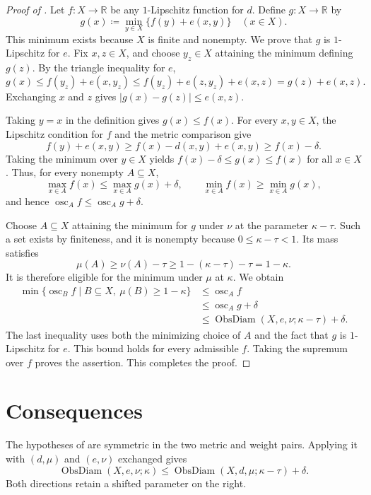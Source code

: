 \documentclass[a4paper,11pt]{article}
\theoremstyle{definition}
\DeclareMathOperator{\ObsDiam}{ObsDiam}
\DeclareMathOperator{\osc}{osc}
\begin{document}
\begin{proof}[Proof of ]
Let $f\colon X\to\mathbb R$ be any $1$-Lipschitz function for $d$. Define $g\colon X\to\mathbb R$ by
\[ g(x)\coloneqq\min_{y\in X}\{f(y)+e(x,y)\}\quad(x\in X). \]
This minimum exists because $X$ is finite and nonempty. We prove that $g$ is $1$-Lipschitz for $e$. Fix $x,z\in X$, and choose $y_z\in X$ attaining the minimum defining $g(z)$. By the triangle inequality for $e$,
\[ g(x)\leq f(y_z)+e(x,y_z)\leq f(y_z)+e(z,y_z)+e(x,z)=g(z)+e(x,z). \]
Exchanging $x$ and $z$ gives $|g(x)-g(z)|\leq e(x,z)$.

Taking $y=x$ in the definition gives $g(x)\leq f(x)$. For every $x,y\in X$, the Lipschitz condition for $f$ and the metric comparison give
\[ f(y)+e(x,y)\geq f(x)-d(x,y)+e(x,y)\geq f(x)-\delta. \]
Taking the minimum over $y\in X$ yields $f(x)-\delta\leq g(x)\leq f(x)$ for all $x\in X$. Thus, for every nonempty $A\subseteq X$,
\[ \max_{x\in A}f(x)\leq\max_{x\in A}g(x)+\delta,\qquad \min_{x\in A}f(x)\geq\min_{x\in A}g(x), \]
and hence $\osc_A f\leq\osc_A g+\delta$.

Choose $A\subseteq X$ attaining the minimum for $g$ under $\nu$ at the parameter $\kappa-\tau$. Such a set exists by finiteness, and it is nonempty because $0\leq\kappa-\tau<1$. Its mass satisfies
\[ \mu(A)\geq\nu(A)-\tau\geq1-(\kappa-\tau)-\tau=1-\kappa. \]
It is therefore eligible for the minimum under $\mu$ at $\kappa$. We obtain
\begin{align*}
\min\{\osc_B f\mid B\subseteq X,\ \mu(B)\geq1-\kappa\}
&\leq\osc_A f\\
&\leq\osc_A g+\delta\\
&\leq\ObsDiam(X,e,\nu;\kappa-\tau)+\delta.
\end{align*}
The last inequality uses both the minimizing choice of $A$ and the fact that $g$ is $1$-Lipschitz for $e$. This bound holds for every admissible $f$. Taking the supremum over $f$ proves the assertion. This completes the proof.
\end{proof}

\section{Consequences}\label{sec:consequences}

The hypotheses of  are symmetric in the two metric and weight pairs. Applying it with $(d,\mu)$ and $(e,\nu)$ exchanged gives
\[ \ObsDiam(X,e,\nu;\kappa)\leq\ObsDiam(X,d,\mu;\kappa-\tau)+\delta. \]
Both directions retain a shifted parameter on the right.
\end{document}
